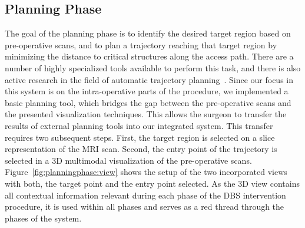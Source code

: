 \documentclass[journal]{vgtc}                %
\begin{document}
\subsection{Planning Phase}\label{sec:overview:planning}
The goal of the planning phase is to identify the desired target region based on pre-operative scans, and to plan a trajectory reaching that target region by minimizing the distance to critical structures along the access path. There are a number of highly specialized tools available to perform this task, and there is also active research in the field of automatic trajectory planning~\cite{Shamir2010}. Since our focus in this system is on the intra-operative parts of the procedure, we implemented a basic planning tool, which bridges the gap between the pre-operative scans and the presented visualization techniques. This allows the surgeon to transfer the results of external planning tools into our integrated system. This transfer requires two subsequent steps. First, the target region is selected on a slice representation of the MRI scan. Second, the entry point of the trajectory is selected in a 3D multimodal visualization of the pre-operative scans. Figure~\ref{fig:planningphase:view} shows the setup of the two incorporated views with both, the target point and the entry point selected. As the 3D view contains all contextual information relevant during each phase of the DBS intervention procedure, it is used within all phases and serves as a red thread through the phases of the system.
\end{document}
